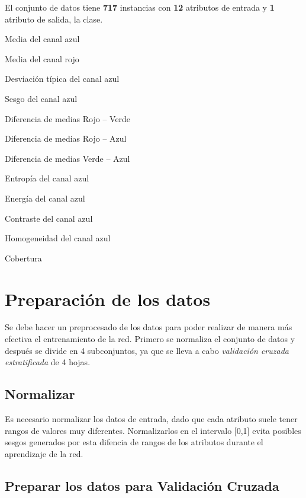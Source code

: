 \documentclass{uc3mpracticas}
\begin{document}
\vspace{2mm}

El conjunto de datos tiene \textbf{717} instancias con \textbf{12} atributos de entrada y \textbf{1} atributo de salida, la clase.

\begin{enumerate}
  \begin{multicols}{2}
  \item Media del canal azul
  \item Media del canal rojo
  \item Desviación típica del canal azul
  \item Sesgo del canal azul
  \item Diferencia de medias Rojo – Verde
  \item Diferencia de medias Rojo – Azul
  \columnbreak
  \item Diferencia de medias Verde – Azul
  \item Entropía del canal azul
  \item Energía del canal azul
  \item Contraste del canal azul
  \item Homogeneidad del canal azul
  \item Cobertura
  \end{multicols}
\end{enumerate}



\section{Preparación de los datos}

Se debe hacer un preprocesado de los datos para poder realizar de manera más efectiva el entrenamiento de la red. Primero se normaliza el conjunto de datos y después se divide en 4 subconjuntos, ya que se lleva a cabo \textit{validación cruzada estratificada} de 4 hojas.

\subsection{Normalizar}

Es necesario normalizar los datos de entrada, dado que cada atributo suele tener rangos de valores muy diferentes. Normalizarlos en el intervalo [0,1] evita posibles sesgos generados por esta difencia de rangos de los atributos durante el aprendizaje de la red.


\subsection{Preparar los datos para Validación Cruzada}
\end{document}
